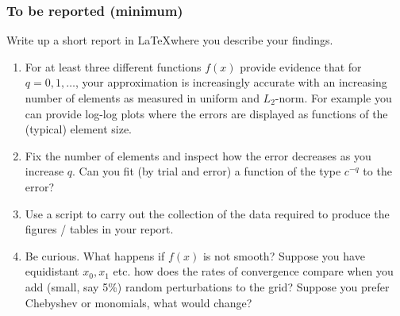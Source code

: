\documentclass[12pt]{article}
\begin{document}
\subsubsection*{To be reported (minimum)}
Write up a short report in \LaTeX where you describe your findings. 
\begin{enumerate}
\item For at least three different functions $f(x)$ provide evidence that for $q = 0,1, \ldots$, your approximation is increasingly accurate with an increasing number of elements as measured in uniform and $L_2$-norm. For example you can provide log-log plots where the errors are displayed as functions of the (typical) element size. 
\item Fix the number of elements and inspect how the error decreases as you increase $q$. Can you fit (by trial and error) a function of the type $c^{-q}$ to the error?
\item Use a script to carry out the collection of the data required to produce the figures / tables in your report. 
\item Be curious. What happens if $f(x)$ is not smooth? Suppose you have equidistant $x_0,x_1$ etc. how does the rates of convergence compare when you add (small, say 5\%) random perturbations to the grid? Suppose you prefer Chebyshev or monomials, what would change?  
\end{enumerate}
\end{document}
